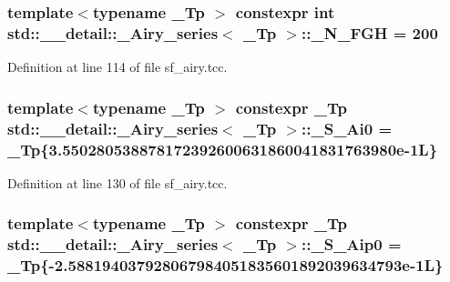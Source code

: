 \subsubsection[{\texorpdfstring{\+\_\+\+N\+\_\+\+F\+GH}{_N_FGH}}]{\setlength{\rightskip}{0pt plus 5cm}template$<$typename \+\_\+\+Tp $>$ constexpr int {\bf std\+::\+\_\+\+\_\+detail\+::\+\_\+\+Airy\+\_\+series}$<$ \+\_\+\+Tp $>$\+::\+\_\+\+N\+\_\+\+F\+GH = 200\hspace{0.3cm}{\ttfamily [static]}}\hypertarget{classstd_1_1____detail_1_1__Airy__series_a01e903f238d8c10c82cea4c115612ad8}{}\label{classstd_1_1____detail_1_1__Airy__series_a01e903f238d8c10c82cea4c115612ad8}


Definition at line 114 of file sf\+\_\+airy.\+tcc.

\subsubsection[{\texorpdfstring{\+\_\+\+S\+\_\+\+Ai0}{_S_Ai0}}]{\setlength{\rightskip}{0pt plus 5cm}template$<$typename \+\_\+\+Tp $>$ constexpr \+\_\+\+Tp {\bf std\+::\+\_\+\+\_\+detail\+::\+\_\+\+Airy\+\_\+series}$<$ \+\_\+\+Tp $>$\+::\+\_\+\+S\+\_\+\+Ai0 = \+\_\+\+Tp\{3.\+550280538878172392600631860041831763980e-\/1\+L\}\hspace{0.3cm}{\ttfamily [static]}}\hypertarget{classstd_1_1____detail_1_1__Airy__series_a530108939a1c52d530e1d2ff577195b2}{}\label{classstd_1_1____detail_1_1__Airy__series_a530108939a1c52d530e1d2ff577195b2}


Definition at line 130 of file sf\+\_\+airy.\+tcc.

\subsubsection[{\texorpdfstring{\+\_\+\+S\+\_\+\+Aip0}{_S_Aip0}}]{\setlength{\rightskip}{0pt plus 5cm}template$<$typename \+\_\+\+Tp $>$ constexpr \+\_\+\+Tp {\bf std\+::\+\_\+\+\_\+detail\+::\+\_\+\+Airy\+\_\+series}$<$ \+\_\+\+Tp $>$\+::\+\_\+\+S\+\_\+\+Aip0 = \+\_\+\+Tp\{-\/2.\+588194037928067984051835601892039634793e-\/1\+L\}\hspace{0.3cm}{\ttfamily [static]}}\hypertarget{classstd_1_1____detail_1_1__Airy__series_a9a0a96224f581add2488a885f08c810f}{}\label{classstd_1_1____detail_1_1__Airy__series_a9a0a96224f581add2488a885f08c810f}



